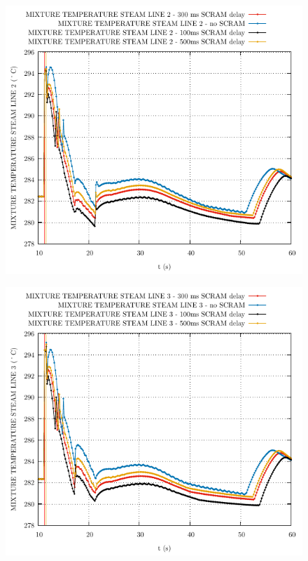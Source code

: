 \documentclass{article}
\begin{document}
\begin{multicols}{2}
\begin{figure}[H]
\end{figure}
\begin{figure}[H]
\centering
\includegraphics[width=\columnwidth]{./graphs/MIXTURE TEMPERATURE STEAM LINE 2_comp.pdf}
\end{figure}
\begin{figure}[H]
\centering
\includegraphics[width=\columnwidth]{./graphs/MIXTURE TEMPERATURE STEAM LINE 3_comp.pdf}

\end{figure}
\end{multicols}
\end{document}
